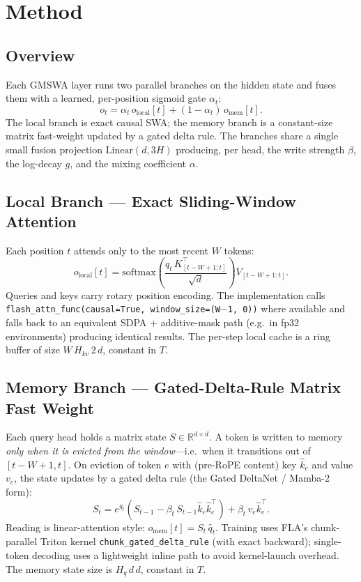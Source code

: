 \documentclass[letterpaper]{article} %
\begin{document}
\section{Method}

\subsection{Overview}
Each GMSWA layer runs two parallel branches on the hidden state and fuses them with a learned, per-position sigmoid gate $\alpha_t$:
\begin{equation}
o_t = \alpha_t \, o_{\mathrm{local}}[t] + (1-\alpha_t)\, o_{\mathrm{mem}}[t].
\label{eq:mix}
\end{equation}
The local branch is exact causal SWA; the memory branch is a constant-size matrix fast-weight updated by a gated delta rule. The branches share a single small fusion projection $\mathrm{Linear}(d, 3H)$ producing, per head, the write strength $\beta$, the log-decay $g$, and the mixing coefficient $\alpha$.

\subsection{Local Branch --- Exact Sliding-Window Attention}
Each position $t$ attends only to the most recent $W$ tokens:
\begin{equation}
o_{\mathrm{local}}[t] = \mathrm{softmax}\!\left( \frac{q_t \, K_{[t-W+1:t]}^\top}{\sqrt{d}} \right) V_{[t-W+1:t]}.
\label{eq:swa}
\end{equation}
Queries and keys carry rotary position encoding. The implementation calls \texttt{flash\_attn\_func(causal=True, window\_size=(W$-$1, 0))} where available and falls back to an equivalent SDPA $+$ additive-mask path (e.g.\ in fp32 environments) producing identical results. The per-step local cache is a ring buffer of size $W\,H_{kv}\,2\,d$, constant in $T$.

\subsection{Memory Branch --- Gated-Delta-Rule Matrix Fast Weight}
Each query head holds a matrix state $S \in \mathbb{R}^{d\times d}$. A token is written to memory \emph{only when it is evicted from the window}---i.e.\ when it transitions out of $[t{-}W{+}1, t]$. On eviction of token $e$ with (pre-RoPE content) key $\hat{k}_e$ and value $v_e$, the state updates by a gated delta rule (the Gated DeltaNet / Mamba-2 form):
\begin{equation}
S_t = e^{g_t}\!\left( S_{t-1} - \beta_t\, S_{t-1}\hat{k}_e \hat{k}_e^\top \right) + \beta_t\, v_e \hat{k}_e^\top.
\label{eq:delta}
\end{equation}
Reading is linear-attention style: $o_{\mathrm{mem}}[t] = S_t\,\hat{q}_t$. Training uses FLA's chunk-parallel Triton kernel \texttt{chunk\_gated\_delta\_rule} (with exact backward); single-token decoding uses a lightweight inline path to avoid kernel-launch overhead. The memory state size is $H_q\,d\,d$, constant in $T$.
\end{document}
